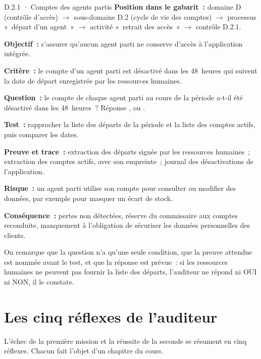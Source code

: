 \begin{boxobjet}{D.2.1 · Comptes des agents partis}
\textbf{Position dans le gabarit~:} domaine D (contrôle d'accès)
$\rightarrow$ sous-domaine D.2 (cycle de vie des comptes) $\rightarrow$
processus «~départ d'un agent~» $\rightarrow$ activité «~retrait des
accès~» $\rightarrow$ contrôle D.2.1.

\textbf{Objectif~:} s'assurer qu'aucun agent parti ne conserve d'accès à
l'application intégrée.

\textbf{Critère~:} le compte d'un agent parti est désactivé dans les
48~heures qui suivent la date de départ enregistrée par les ressources
humaines.

\textbf{Question~:} le compte de chaque agent parti au cours de la période
a-t-il été désactivé dans les 48~heures~? Réponse \OUI{}, \NON{} ou \NEK{}.

\textbf{Test~:} rapprocher la liste des départs de la période et la liste
des comptes actifs, puis comparer les dates.

\textbf{Preuve et trace~:} extraction des départs signée par les ressources
humaines~; extraction des comptes actifs, avec son empreinte~; journal des
désactivations de l'application.

\textbf{Risque~:} un agent parti utilise son compte pour consulter ou
modifier des données, par exemple pour masquer un écart de stock.

\textbf{Conséquence~:} pertes non détectées, réserve du commissaire aux
comptes reconduite, manquement à l'obligation de sécuriser les données
personnelles des clients.
\end{boxobjet}

On remarque que la question n'a qu'une seule condition, que la preuve
attendue est nommée avant le test, et que la réponse \NEK{} est prévue~:
si les ressources humaines ne peuvent pas fournir la liste des départs,
l'auditeur ne répond ni OUI ni NON, il le constate.

\section{Les cinq réflexes de l'auditeur}
\label{sec:pro-reflexes}

L'échec de la première mission et la réussite de la seconde se résument en
cinq réflexes. Chacun fait l'objet d'un chapitre du cours.

